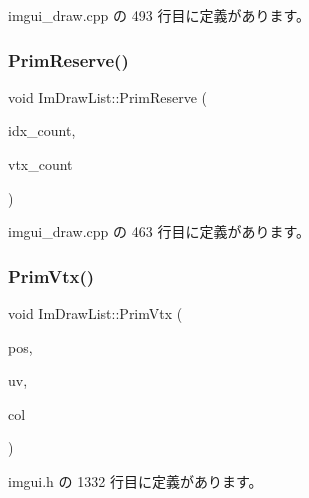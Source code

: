  imgui\+\_\+draw.\+cpp の 493 行目に定義があります。

\mbox{\label{struct_im_draw_list_a879aa38dbfb0344e3e023d65c002c7d7}} 
\subsubsection{\texorpdfstring{Prim\+Reserve()}{PrimReserve()}}
{\footnotesize\ttfamily void Im\+Draw\+List\+::\+Prim\+Reserve (\begin{DoxyParamCaption}\item[{int}]{idx\+\_\+count,  }\item[{int}]{vtx\+\_\+count }\end{DoxyParamCaption})}



 imgui\+\_\+draw.\+cpp の 463 行目に定義があります。

\mbox{\label{struct_im_draw_list_a405377158f0028ad8b4fb6509eef4532}} 
\subsubsection{\texorpdfstring{Prim\+Vtx()}{PrimVtx()}}
{\footnotesize\ttfamily void Im\+Draw\+List\+::\+Prim\+Vtx (\begin{DoxyParamCaption}\item[{const \mbox{\hyperlink{struct_im_vec2}{Im\+Vec2}} \&}]{pos,  }\item[{const \mbox{\hyperlink{struct_im_vec2}{Im\+Vec2}} \&}]{uv,  }\item[{\mbox{\hyperlink{imgui_8h_a118cff4eeb8d00e7d07ce3d6460eed36}{Im\+U32}}}]{col }\end{DoxyParamCaption})\hspace{0.3cm}{\ttfamily [inline]}}



 imgui.\+h の 1332 行目に定義があります。

\mbox{\label{struct_im_draw_list_a42b72f87a0084c02f11dcd1560c8bbc7}} 
